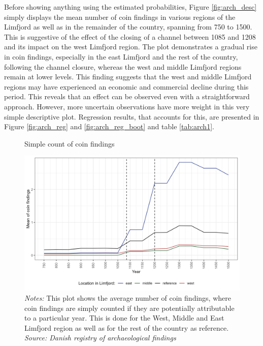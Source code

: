 \documentclass[11pt]{article}
\begin{document}
Before showing anything using the estimated probabilities, Figure \ref{fig:arch_desc} simply displays the mean number of coin findings in various regions of the Limfjord as well as in the remainder of the country, spanning from 750 to 1500. This is suggestive of the effect of the closing of a channel between 1085 and 1208 and its impact on the west Limfjord region. The plot demonstrates a gradual rise in coin findings, especially in the east Limfjord and the rest of the country, following the channel closure, whereas the west and middle Limfjord regions remain at lower levels. This finding suggests that the west and middle Limfjord regions may have experienced an economic and commercial decline during this period. This reveals that an effect can be observed even with a straightforward approach. However, more uncertain observations have more weight in this very simple descriptive plot. Regression results, that accounts for this, are presented in Figure \ref{fig:arch_reg} and \ref{fig:arch_reg_boot} and table \ref{tab:arch1}.

\begin{figure}[H]
     \centering
     \caption{Simple count of coin findings}\label{fig:arch_desc}
     \includegraphics[width=\textwidth]{Plots/Arch_descriptive.png}
     \parbox{0.9\textwidth}{
     \caption*{\footnotesize \textit{Notes:} This plot shows the average number of coin findings, where coin findings are simply counted if they are potentially attributable to a particular year. This is done for the West, Middle and East Limfjord region as well as for the rest of the country as reference. \\ \textit{Source: Danish registry of archaeological findings}}
}
     \label{fig:regpops}
\end{figure}
\end{document}

